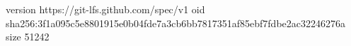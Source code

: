 version https://git-lfs.github.com/spec/v1
oid sha256:3f1a095c5e8801915e0b04fde7a3cb6bb7817351af85ebf7fdbe2ac32246276a
size 51242
